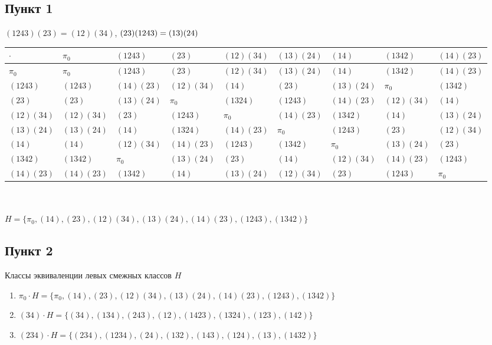 \documentclass{article}
\begin{document}
\subsection*{Пункт 1}
$(1243)(23) = (12)(34)$, $(23)(1243) = (13)(24)\\\\$
\begin{tabular}{l|llllllll}
      $\cdot$    & $\pi_0$    & $(1243)$   & $(23)$     & $(12)(34)$ & $(13)(24)$ & $(14)$     & $(1342)$   & $(14)(23)$  \\ 
    \midrule
      $\pi_0$    & $\pi_0$    & $(1243)$   & $(23)$     & $(12)(34)$ & $(13)(24)$ & $(14)$     & $(1342)$   & $(14)(23)$  \\
      $(1243)$   & $(1243)$   & $(14)(23)$ & $(12)(34)$ & $(14)$     & $(23)$     & $(13)(24)$ & $\pi_0$    & $(1342)$    \\
      $(23)$     & $(23)$     & $(13)(24)$ & $\pi_0$    & $(1324)$   & $(1243)$   & $(14)(23)$ & $(12)(34)$ & $(14)$      \\
      $(12)(34)$ & $(12)(34)$ & $(23)$     & $(1243)$   & $\pi_0$    & $(14)(23)$ & $(1342)$   & $(14)$     & $(13)(24)$  \\
      $(13)(24)$ & $(13)(24)$ & $(14)$     & $(1324)$   & $(14)(23)$ & $\pi_0$    & $(1243)$   & $(23)$     & $(12)(34)$  \\
      $(14)$     & $(14)$     & $(12)(34)$ & $(14)(23)$ & $(1243)$   & $(1342)$   & $\pi_0$    & $(13)(24)$ & $(23)$      \\
      $(1342)$   & $(1342)$   & $\pi_0$    & $(13)(24)$ & $(23)$     & $(14)$     & $(12)(34)$ & $(14)(23)$ & $(1243)$    \\
      $(14)(23)$ & $(14)(23)$ & $(1342)$   & $(14)$     & $(13)(24)$ & $(12)(34)$ & $(23)$     & $(1243)$   & $\pi_0$     \\
\end{tabular}
\\\\
$H = \{\pi_0, (14), (23), (12)(34), (13)(24), (14)(23), (1243), (1342)\}$

\subsection*{Пункт 2}
Классы эквиваленции левых смежных классов $H$
\begin{enumerate}
    \item $\pi_0 \cdot  H = \{\pi_0, (14), (23), (12)(34), (13)(24), (14)(23), (1243), (1342)\}$
    \item $(34) \cdot  H = \{(34), (134), (243), (12), (1423), (1324), (123), (142)\}$
    \item $(234) \cdot  H = \{(234), (1234), (24), (132), (143), (124), (13), (1432)\}$
\end{enumerate}
\end{document}
